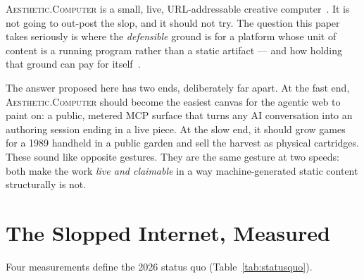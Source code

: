 \documentclass[10pt,letterpaper,twocolumn]{article}
\newcommand{\ac}{\textsc{Aesthetic.Computer}}
\begin{document}
\ac{} is a small, live, URL-addressable creative computer~\citep{scudder2026ac,scudder2026urltradition}. It is not going to out-post the slop, and it should not try. The question this paper takes seriously is where the \emph{defensible} ground is for a platform whose unit of content is a running program rather than a static artifact --- and how holding that ground can pay for itself~\citep{scudder2026sustainability}.

The answer proposed here has two ends, deliberately far apart. At the fast end, \ac{} should become the easiest canvas for the agentic web to paint on: a public, metered MCP surface that turns any AI conversation into an authoring session ending in a live piece. At the slow end, it should grow games for a 1989 handheld in a public garden and sell the harvest as physical cartridges. These sound like opposite gestures. They are the same gesture at two speeds: both make the work \emph{live and claimable} in a way machine-generated static content structurally is not.

\section{The Slopped Internet, Measured}

Four measurements define the 2026 status quo (Table~\ref{tab:statusquo}).
\end{document}
